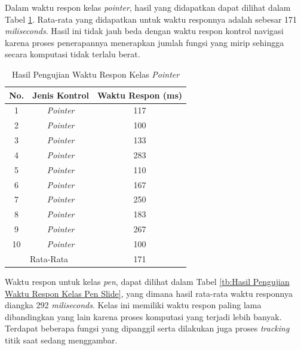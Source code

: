 Dalam waktu respon kelas \emph{pointer}, hasil yang didapatkan dapat dilihat dalam Tabel \ref{tb:Hasil Pengujian Waktu Respon Kelas Pointer Slide}. Rata-rata yang didapatkan untuk waktu responnya adalah sebesar 171 \emph{miliseconds}. Hasil ini tidak jauh beda dengan waktu respon kontrol navigasi karena proses penerapannya menerapkan jumlah fungsi yang mirip sehingga secara komputasi tidak terlalu berat.

\begin{longtable}{|c|c|c|}
  \caption{Hasil Pengujian Waktu Respon Kelas \emph{Pointer}}
  \label{tb:Hasil Pengujian Waktu Respon Kelas Pointer Slide}\\
  \hline
  \rowcolor[HTML]{FFFFFF}
  \textbf{No.} & \textbf{Jenis Kontrol} & \textbf{Waktu Respon (ms)} \\
  \endhead
  \hline
  1 & \emph{Pointer} & 117 \\
  2 & \emph{Pointer} & 100 \\
  3 & \emph{Pointer} & 133 \\
  4 & \emph{Pointer} & 283 \\
  \hline
  5 & \emph{Pointer} & 110 \\
  6 & \emph{Pointer} & 167 \\
  7 & \emph{Pointer} & 250 \\
  8 & \emph{Pointer} & 183 \\
  9 & \emph{Pointer} & 267 \\
  10 & \emph{Pointer} & 100 \\
  \hline
  \multicolumn{2}{|c|}{Rata-Rata} & 171 \\
  \hline
\end{longtable}

Waktu respon untuk kelas \emph{pen}, dapat dilihat dalam Tabel \ref{tb:Hasil Pengujian Waktu Respon Kelas Pen Slide}, yang dimana hasil rata-rata waktu responnya diangka 292 \emph{miliseconds}. Kelas ini memiliki waktu respon paling lama dibandingkan yang lain karena proses komputasi yang terjadi lebih banyak. Terdapat beberapa fungsi yang dipanggil serta dilakukan juga proses \emph{tracking} titik saat sedang menggambar. 

